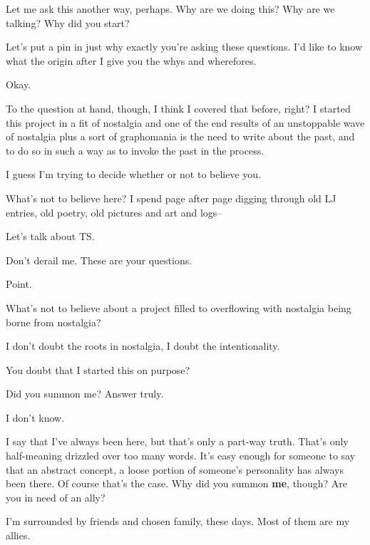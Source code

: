 \label{ally:20}
\begin{paracol}{2}
  \begin{leftcolumn}

\begin{ally}
Let me ask this another way, perhaps. Why are we doing this? Why are we talking? Why did you start?
\end{ally}
Let's put a pin in just why exactly you're asking these questions. I'd like to know what the origin after I give you the whys and wherefores.

\begin{ally}
Okay.
\end{ally}
To the question at hand, though, I think I covered that before, right? I started this project in a fit of nostalgia and one of the end results of an unstoppable wave of nostalgia plus a sort of graphomania is the need to write about the past, and to do so in such a way as to invoke the past in the process.

\begin{ally}
I guess I'm trying to decide whether or not to believe you.
\end{ally}
What's not to believe here? I spend page after page digging through old LJ entries, old poetry, old pictures and art and logs--

\begin{ally}
Let's talk about TS.
\end{ally}
Don't derail me. These are your questions.

\begin{ally}
Point.
\end{ally}
What's not to believe about a project filled to overflowing with nostalgia being borne from nostalgia?

\begin{ally}
I don't doubt the roots in nostalgia, I doubt the intentionality.
\end{ally}
You doubt that I started this on purpose?

\begin{ally}
Did you summon me? Answer truly.
\end{ally}
I don't know.

\begin{ally}
I say that I've always been here, but that's only a part-way truth. That's only half-meaning drizzled over too many words. It's easy enough for someone to say that an abstract concept, a loose portion of someone's personality has always been there. Of course that's the case. Why did you summon \textbf{me}, though? Are you in need of an ally?
\end{ally}
I'm surrounded by friends and chosen family, these days. Most of them are my allies.


\end{leftcolumn}
\end{paracol}
